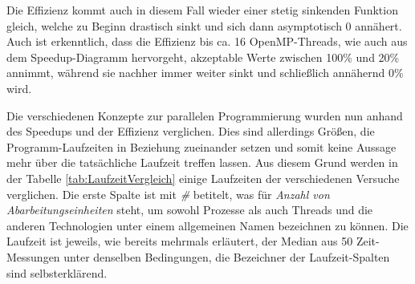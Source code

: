 \begin{description}
						Die Effizienz kommt auch in diesem Fall wieder einer stetig sinkenden Funktion gleich, welche zu Beginn drastisch sinkt und sich dann asymptotisch 0 annähert. Auch ist erkenntlich, dass die Effizienz bis ca. 16 OpenMP-Threads, wie auch aus dem Speedup-Diagramm hervorgeht, akzeptable Werte zwischen 100\% und 20\% annimmt, während sie nachher immer weiter sinkt und schließlich annähernd 0\% wird.

				\end{description}
			
				Die verschiedenen Konzepte zur parallelen Programmierung wurden nun anhand des Speedups und der Effizienz verglichen. Dies sind allerdings Größen, die Programm-Laufzeiten in Beziehung zueinander setzen und somit keine Aussage mehr über die tatsächliche Laufzeit treffen lassen. Aus diesem Grund werden in der Tabelle \ref{tab:LaufzeitVergleich} einige Laufzeiten der verschiedenen Versuche verglichen. Die erste Spalte ist mit \textit{\#} betitelt, was für \textit{Anzahl von Abarbeitungseinheiten} steht, um sowohl Prozesse als auch Threads und die anderen Technologien unter einem allgemeinen Namen bezeichnen zu können. Die Laufzeit ist jeweils, wie bereits mehrmals erläutert, der Median aus 50 Zeit-Messungen unter denselben Bedingungen, die Bezeichner der Laufzeit-Spalten sind selbsterklärend.
				
